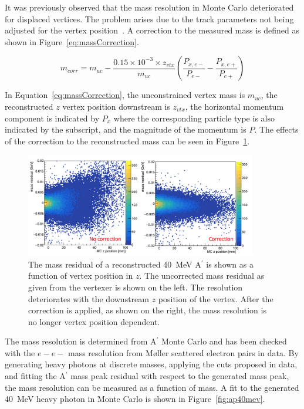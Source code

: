 It was previously observed that the mass resolution in Monte Carlo deteriorated for displaced vertices. The problem arises due to the track parameters not being adjusted for the vertex position~\cite{billoir_fast_1992}. A correction to the measured mass is defined as shown in Figure~\ref{eq:massCorrection}.

\begin{equation}
\label{eq:massCorrection}
m_{corr} = m_{uc} - \dfrac{0.15\times 10^{-3}\times z_{vtx}}{m_{uc}}(\dfrac{P_{x,e-}}{P_{e-}}-\dfrac{P_{x,e+}}{P_{e+}})            
\end{equation}

In Equation~\eqref{eq:massCorrection}, the unconstrained vertex mass is $m_{uc}$, the reconstructed $z$ vertex position downstream is $z_{vtx}$, the horizontal momentum component is indicated by $P_x$ where the corresponding particle type is also indicated by the subscript, and the magnitude of the momentum is $P$. The effects of the correction to the reconstructed mass can be seen in Figure~\ref{fig:effectMCorr}.

\begin{figure}[H]
  \centering
      \includegraphics[width=0.9\textwidth]{pics/searching/massCorrection.png}
  \caption[Correction to the reconstructed mass for a 40~MeV A$^{\prime}$]{The mass residual of a reconstructed 40~MeV A$^{\prime}$ is shown as a function of vertex position in $z$. The uncorrected mass residual as given from the vertexer is shown on the left. The resolution deteriorates with the downstream $z$ position of the vertex. After the correction is applied, as shown on the right, the mass resolution is no longer vertex position dependent.}
  \label{fig:effectMCorr}
\end{figure} 

The mass resolution is determined from A$^{\prime}$ Monte Carlo and has been checked with the $e-e-$ mass resolution from M\o ller scattered electron pairs in data. By generating heavy photons at discrete masses, applying the cuts proposed in data, and fitting the A$^{\prime}$ mass peak residual with respect to the generated mass peak, the mass resolution can be measured as a function of mass. A fit to the generated 40~MeV heavy photon in Monte Carlo is shown in Figure~\ref{fig:ap40mev}.

